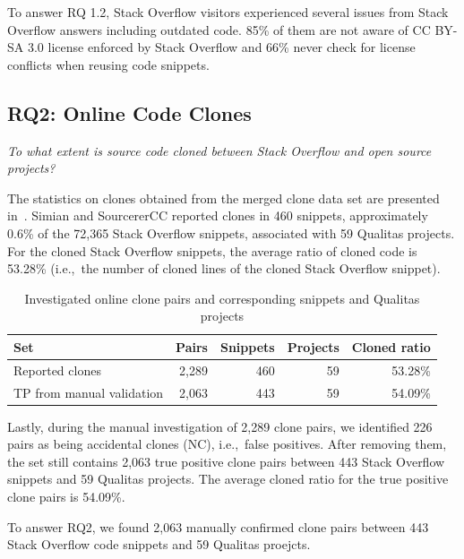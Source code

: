 \documentclass[10pt,journal,compsoc]{IEEEtran}
\newenvironment{boxquote}{\vspace{-1ex}\setlength{\FrameSep}{1\fboxsep}\begin{framed}\setlength{\parskip}{0.5\baselineskip}\setlength{\parindent}{0pt}}{\end{framed}}
\begin{document}
\begin{boxquote}
	To answer RQ 1.2, Stack Overflow visitors experienced several issues from Stack
Overflow answers including outdated code. 85\% of them are not aware of
CC BY-SA 3.0 license enforced by Stack Overflow and 66\% never check for license
conflicts when reusing code snippets.
\end{boxquote}

\subsection{RQ2: Online Code Clones} 
\vspace{0.25cm}
\textit{To what extent is source
	code cloned between Stack Overflow and open source projects?}
\vspace{0.25cm}

The statistics on clones obtained from the merged clone data set are
presented in~. Simian and SourcererCC
reported clones in 460 snippets, approximately 0.6\% of the
72,365 Stack Overflow snippets, associated with 59 Qualitas
projects. For the cloned Stack Overflow snippets, the
average ratio of cloned code is 53.28\% (i.e.,\ the number of cloned
lines of the cloned Stack Overflow snippet).

\begin{table}
	\caption{Investigated online clone pairs and corresponding snippets
		and Qualitas projects}
	\label{tab:snippets}
	\centering
	\begin{tabular}{p{2.2cm}rrrr}
		\toprule
		Set & Pairs & Snippets & Projects & Cloned ratio \\
		\midrule
		Reported clones & 2,289 & 460 & 59 & 53.28\% \\ 
		\midrule
		TP from manual validation & 2,063 & 443 & 59 & 54.09\% \\ 
		\bottomrule
	\end{tabular}
\end{table}

Lastly, during the manual investigation of 2,289 clone pairs, we identified 226 pairs
as being accidental clones (NC), i.e.,~false positives. After removing
them, the set still contains 2,063 true positive clone pairs between 443 Stack
Overflow snippets and 59 Qualitas projects. The average cloned ratio for the
true positive clone pairs is 54.09\%.

\begin{boxquote}
	To answer RQ2, we found 2,063 manually confirmed clone pairs between 443 Stack Overflow code snippets
	and 59 Qualitas proejcts. 
\end{boxquote}
\end{document}
